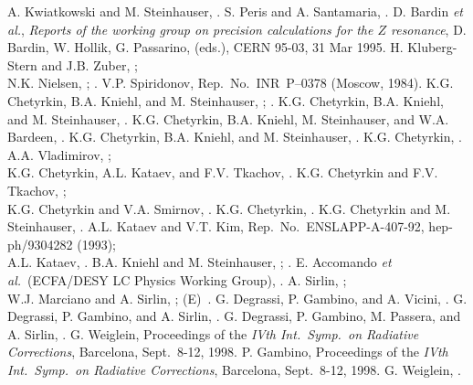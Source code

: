   A. Kwiatkowski and M. Steinhauser, .
  S. Peris and A. Santamaria, .
  D. Bardin {\it et al.},
  {\it Reports of the working group on precision calculations for the
    $Z$ resonance},
  D. Bardin, W. Hollik, G. Passarino, (eds.),
  CERN 95-03, 31 Mar 1995.
  H. Kluberg-Stern and J.B. Zuber, ;\\
  N.K. Nielsen, ; .
  V.P. Spiridonov,  Rep.~No.~INR~P--0378 (Moscow, 1984).
  K.G. Chetyrkin, B.A. Kniehl, and M. Steinhauser,
  ; .
  K.G. Chetyrkin, B.A. Kniehl, and M. Steinhauser, .
  K.G. Chetyrkin, B.A. Kniehl, M. Steinhauser, and W.A. Bardeen,
  .
  K.G. Chetyrkin, B.A. Kniehl, and M. Steinhauser, .
  K.G. Chetyrkin, .
  A.A. Vladimirov, ;\\
  K.G. Chetyrkin, A.L. Kataev, and F.V. Tkachov, .
  K.G. Chetyrkin and F.V. Tkachov, ;\\
  K.G. Chetyrkin and V.A. Smirnov, .
  K.G. Chetyrkin, .
  K.G. Chetyrkin and M. Steinhauser, .
  A.L. Kataev and V.T. Kim, Rep.~No.\ ENSLAPP-A-407-92, hep-ph/9304282
  (1993);\\
  A.L. Kataev, .
  B.A. Kniehl and M. Steinhauser, ; .
  E. Accomando {\it et al.}~(ECFA/DESY LC Physics Working Group), 
  .
  A. Sirlin, ;\\
  W.J. Marciano and A. Sirlin, ; 
  (E)~.
  G. Degrassi, P. Gambino, and A. Vicini, .
  G. Degrassi, P. Gambino, and A. Sirlin, .
  G. Degrassi, P. Gambino, M. Passera, and A. Sirlin, .
  G. Weiglein, Proceedings of the {\it IVth Int.\ Symp.\ on Radiative
  Corrections}, Barcelona, Sept.~8-12, 1998.
  P. Gambino, Proceedings of the {\it IVth Int.\ Symp.\ on Radiative
  Corrections}, Barcelona, Sept.~8-12, 1998.
  G. Weiglein, .
